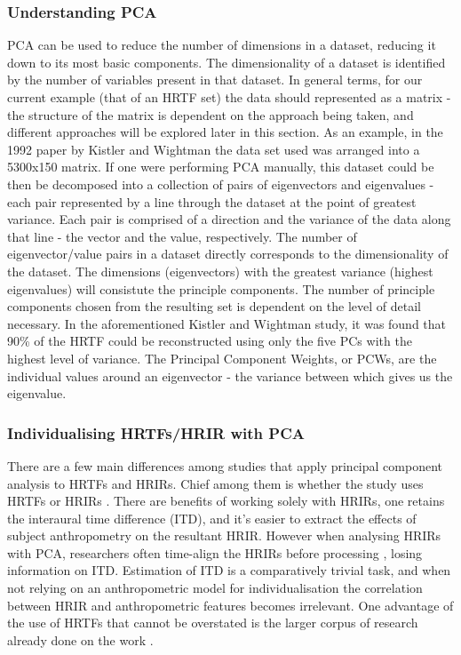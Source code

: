 \subsubsection{Understanding PCA}
PCA can be used to reduce the number of dimensions in a dataset, reducing it down to its most basic components. The dimensionality of a dataset is identified by the number of variables present in that dataset. In general terms, for our current example (that of an HRTF set) the data should represented as a matrix - the structure of the matrix is dependent on the approach being taken, and different approaches will be explored later in this section. As an example, in the 1992 paper by Kistler and Wightman \citep{Kistler1992} the data set used was arranged into a 5300x150 matrix. If one were performing PCA manually, this dataset could be then be decomposed into a collection of pairs of eigenvectors and eigenvalues - each pair represented by a line through the dataset at the point of greatest variance. Each pair is comprised of a direction and the variance of the data along that line - the vector and the value, respectively. The number of eigenvector/value pairs in a dataset directly corresponds to the dimensionality of the dataset. The dimensions (eigenvectors) with the greatest variance (highest eigenvalues) will consistute the principle components. The number of principle components chosen from the resulting set is dependent on the level of detail necessary. In the aforementioned Kistler and Wightman study, it was found that 90\% of the HRTF could be reconstructed using only the five PCs with the highest level of variance. The Principal Component Weights, or PCWs, are the individual values around an eigenvector - the variance between which gives us the eigenvalue.


\subsubsection{Individualising HRTFs/HRIR with PCA}
There are a few main differences among studies that apply principal component analysis to HRTFs and HRIRs. Chief among them is whether the study uses HRTFs \citep{Holzl2014a} \citep{Gutierrez-Parera2017} or HRIRs \citep{Hwang2008} \citep{Hwang2007} \citep{Fink2012}. There are benefits of working solely with HRIRs, one retains the interaural time difference (ITD), and it's easier to extract the effects of subject anthropometry on the resultant HRIR. However when analysing HRIRs with PCA, researchers often time-align the HRIRs before processing \citep{hwang2010customization}, losing information on ITD. Estimation of ITD is a comparatively trivial task, and when not relying on an anthropometric model for individualisation the correlation between HRIR and anthropometric features becomes irrelevant. One advantage of the use of HRTFs that cannot be overstated is the larger corpus of research already done on the work \citep{Holzl2014a}. 

